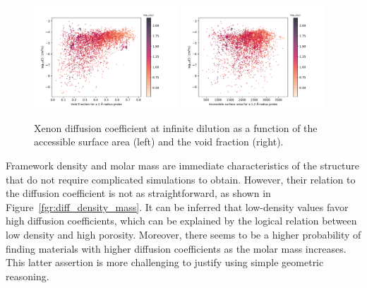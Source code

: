 \documentclass[main]{subfiles}
\begin{document}
\begin{figure}[ht]
  \centering
    \includegraphics[width=0.48\textwidth]{figures/5-diffusion/D_log-vf_2_s_+.pdf}
    \includegraphics[width=0.48\textwidth]{figures/5-diffusion/D_log-sa_12_s_+.pdf}
    \caption{Xenon diffusion coefficient at infinite dilution as a function of the accessible surface area (left) and the void fraction (right). }\label{fgr:diff_sa_vf}
\end{figure}

Framework density and molar mass are immediate characteristics of the structure that do not require complicated simulations to obtain. However, their relation to the diffusion coefficient is not as straightforward, as shown in Figure~\ref{fgr:diff_density_mass}. It can be inferred that low-density values favor high diffusion coefficients, which can be explained by the logical relation between low density and high porosity. Moreover, there seems to be a higher probability of finding materials with higher diffusion coefficients as the molar mass increases. This latter assertion is more challenging to justify using simple geometric reasoning.
\end{document}
